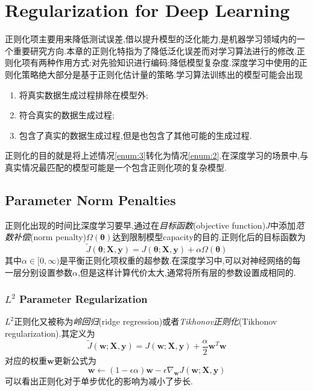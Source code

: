 \chapter{Regularization for Deep Learning}

正则化项主要用来降低测试误差,借以提升模型的泛化能力,是机器学习领域内的一个重要研究方向.本章的正则化特指为了降低泛化误差而对学习算法进行的修改.正则化项有两种作用方式:对先验知识进行编码;降低模型复杂度.深度学习中使用的正则化策略绝大部分是基于正则化估计量的策略.学习算法训练出的模型可能会出现
\begin{enumerate}
    \item 将真实数据生成过程排除在模型外;
    \item 符合真实的数据生成过程;\label{enum:2}
    \item 包含了真实的数据生成过程,但是也包含了其他可能的生成过程.\label{enum:3}
\end{enumerate}
正则化的目的就是将上述情况\ref{enum:3}转化为情况\ref{enum:2}.在深度学习的场景中,与真实情况最匹配的模型可能是一个包含正则化项的复杂模型.

\section{Parameter Norm Penalties}

正则化出现的时间比深度学习要早,通过在\textit{目标函数}(objective function)$J$中添加\textit{范数补偿}(norm penalty)$\Omega({\bm\theta})$达到限制模型capacity的目的.正则化后的目标函数为
\begin{equation}\label{eq:cost_func}
\tilde J({\bm\theta};\bm{X,y})=J({\bm\theta};\bm{X,y})+\alpha\Omega({\bm\theta})
\end{equation}
其中$\alpha\in[0,\infty)$是平衡正则化项权重的超参数.在深度学习中,可以对神经网络的每一层分别设置参数$\alpha$,但是这样计算代价太大,通常将所有层的参数设置成相同的.

\subsection{$L^2$ Parameter Regularization}

$L^2$正则化又被称为\textit{岭回归}(ridge regression)或者\textit{Tikhonov正则化}(Tikhonov regularization).其定义为
\begin{equation}
\tilde J(\bm w;\bm{X,y})=J(\bm w;\bm{X,y})+\frac{\alpha}{2}\bm w^T\bm w
\end{equation}
对应的权重$\bm w$更新公式为
\begin{equation}
\bm w\leftarrow(1-\epsilon\alpha)\bm w-\epsilon\nabla_{\bm w}J(\bm {w;X,y})
\end{equation}
可以看出正则化对于单步优化的影响为减小了步长.

